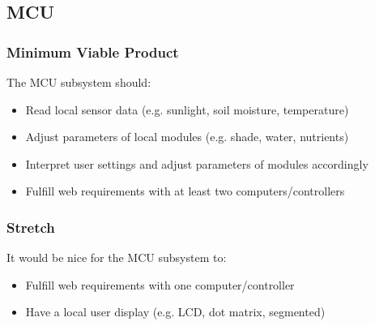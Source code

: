 \subsection{MCU}
\subsubsection{Minimum Viable Product}
The MCU subsystem should:
\begin{itemize}
    \item Read local sensor data (e.g. sunlight, soil moisture, temperature)
    \item Adjust parameters of local modules (e.g. shade, water, nutrients)
    \item Interpret user settings and adjust parameters of modules accordingly
    \item Fulfill web requirements with at least two computers/controllers
\end{itemize}
\subsubsection{Stretch}
It would be nice for the MCU subsystem to:
\begin{itemize}
    \item Fulfill web requirements with one computer/controller
    \item Have a local user display (e.g. LCD, dot matrix, segmented)
\end{itemize}